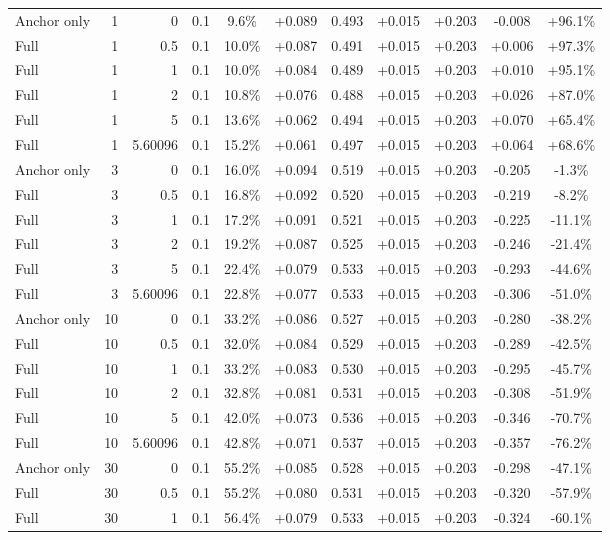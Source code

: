 \begin{table}[htbp]
\begin{tabular}{lrrrccccccc}
Anchor only & 1 & 0 & 0.1 & 9.6\% & +0.089 & 0.493 & +0.015 & +0.203 & -0.008 & +96.1\% \\
Full & 1 & 0.5 & 0.1 & 10.0\% & +0.087 & 0.491 & +0.015 & +0.203 & +0.006 & +97.3\% \\
Full & 1 & 1 & 0.1 & 10.0\% & +0.084 & 0.489 & +0.015 & +0.203 & +0.010 & +95.1\% \\
Full & 1 & 2 & 0.1 & 10.8\% & +0.076 & 0.488 & +0.015 & +0.203 & +0.026 & +87.0\% \\
Full & 1 & 5 & 0.1 & 13.6\% & +0.062 & 0.494 & +0.015 & +0.203 & +0.070 & +65.4\% \\
Full & 1 & 5.60096 & 0.1 & 15.2\% & +0.061 & 0.497 & +0.015 & +0.203 & +0.064 & +68.6\% \\
Anchor only & 3 & 0 & 0.1 & 16.0\% & +0.094 & 0.519 & +0.015 & +0.203 & -0.205 & -1.3\% \\
Full & 3 & 0.5 & 0.1 & 16.8\% & +0.092 & 0.520 & +0.015 & +0.203 & -0.219 & -8.2\% \\
Full & 3 & 1 & 0.1 & 17.2\% & +0.091 & 0.521 & +0.015 & +0.203 & -0.225 & -11.1\% \\
Full & 3 & 2 & 0.1 & 19.2\% & +0.087 & 0.525 & +0.015 & +0.203 & -0.246 & -21.4\% \\
Full & 3 & 5 & 0.1 & 22.4\% & +0.079 & 0.533 & +0.015 & +0.203 & -0.293 & -44.6\% \\
Full & 3 & 5.60096 & 0.1 & 22.8\% & +0.077 & 0.533 & +0.015 & +0.203 & -0.306 & -51.0\% \\
Anchor only & 10 & 0 & 0.1 & 33.2\% & +0.086 & 0.527 & +0.015 & +0.203 & -0.280 & -38.2\% \\
Full & 10 & 0.5 & 0.1 & 32.0\% & +0.084 & 0.529 & +0.015 & +0.203 & -0.289 & -42.5\% \\
Full & 10 & 1 & 0.1 & 33.2\% & +0.083 & 0.530 & +0.015 & +0.203 & -0.295 & -45.7\% \\
Full & 10 & 2 & 0.1 & 32.8\% & +0.081 & 0.531 & +0.015 & +0.203 & -0.308 & -51.9\% \\
Full & 10 & 5 & 0.1 & 42.0\% & +0.073 & 0.536 & +0.015 & +0.203 & -0.346 & -70.7\% \\
Full & 10 & 5.60096 & 0.1 & 42.8\% & +0.071 & 0.537 & +0.015 & +0.203 & -0.357 & -76.2\% \\
Anchor only & 30 & 0 & 0.1 & 55.2\% & +0.085 & 0.528 & +0.015 & +0.203 & -0.298 & -47.1\% \\
Full & 30 & 0.5 & 0.1 & 55.2\% & +0.080 & 0.531 & +0.015 & +0.203 & -0.320 & -57.9\% \\
Full & 30 & 1 & 0.1 & 56.4\% & +0.079 & 0.533 & +0.015 & +0.203 & -0.324 & -60.1\% \\

\end{tabular}
\end{table}
